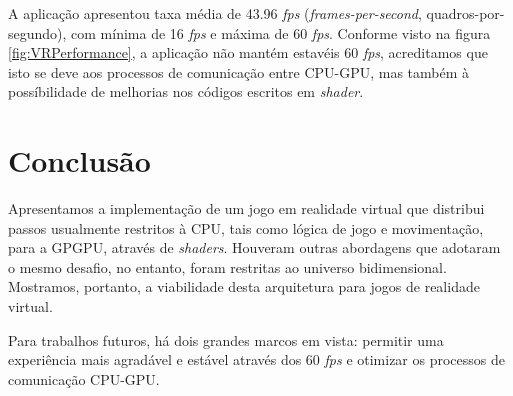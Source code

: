 \documentclass[conference]{IEEEtran}
\begin{document}
A aplicação apresentou taxa média de 43.96 \textit{fps} (\textit{frames-per-second}, quadros-por-segundo), com mínima de 16 \textit{fps} e máxima de 60 \textit{fps}. Conforme visto na figura \ref{fig:VRPerformance}, a aplicação não mantém estavéis 60 \textit{fps}, acreditamos que isto se deve aos processos de comunicação entre CPU-GPU, mas também à possíbilidade de melhorias nos códigos escritos em \textit{shader}.

\section{Conclusão}\label{sec:conclusion}
Apresentamos a implementação de um jogo em realidade virtual que distribui passos usualmente restritos à CPU, tais como lógica de jogo e movimentação, para a GPGPU, através de \textit{shaders}. Houveram outras abordagens que adotaram o mesmo desafio, no entanto, foram restritas ao universo bidimensional. Mostramos, portanto, a viabilidade desta arquitetura para jogos de realidade virtual.

Para trabalhos futuros, há dois grandes marcos em vista: permitir uma experiência mais agradável e estável através dos 60 \textit{fps} e otimizar os processos de comunicação CPU-GPU.




\end{document}
